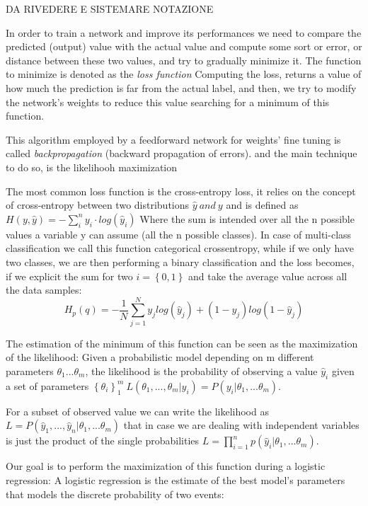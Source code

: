 \documentclass[a4paper,11pt]{article}
\begin{document}
DA RIVEDERE E SISTEMARE NOTAZIONE

In order to train a network and improve its performances we need to compare the predicted (output) value with the actual value and compute some sort or error, or distance between these two values, and try to gradually minimize it.
The function to minimize is denoted as the \emph{loss function}
Computing the loss, returns a value of how much the prediction is far from the actual label, and then, we try to modify the network's weights to reduce this value searching for a minimum of this function.

This algorithm employed by a feedforward network for weights' fine tuning is called \emph{backpropagation} (backward propagation of errors).
and the main technique to do so, is the likelihooh maximization

The most common loss function is the cross-entropy loss, it relies on the concept of cross-entropy between two distributions $\hat y \ and \ y$ and is defined as
$H(y, \hat y) = -\sum_i^n y_i \cdot log(\hat y_i)$
Where the sum is intended over all the n possible values a variable y can assume (all the n possible classes).
In case of multi-class classification we call this function categorical crossentropy, while if we only have two classes, we are then performing a binary classification and the loss becomes, if we explicit the sum for two $i = \left\{0, 1\right\}$ and take the average value across all the data samples:
\begin{equation}
H_p(q) = -\frac{1}{N} \sum_{j= 1}^N y_j log(\hat y_j) + (1-y_j)log(1-\hat y_j)
\end{equation}

The estimation of the minimum of this function can be seen as the maximization of the likelihood:
Given a probabilistic model depending on m different parameters $\theta_1 ... \theta_m$, the likelihood is the probability of observing a value $\hat y_i$ given a set of parameters $\left\{\theta_i \right\}_1 ^m \ L(\theta_1, ..., \theta_m | y_i) = P(y_i|\theta_1, ...\theta_m)$.

For a subset of observed value we can write the likelihood as $L = P(\hat y_1, ..., \hat y_n | \theta_1, ...\theta_m)$ that in case we are dealing with independent variables is just the product of the single probabilities $L =\prod_{i=1}^n p(\hat y_i|\theta_1, ...\theta_m)$.


Our goal is to perform the maximization of this function during a logistic regression:
A logistic regression is the estimate of the best model's parameters that models the discrete probability of two events:
\end{document}
